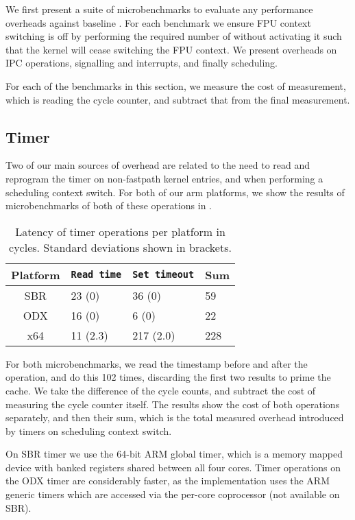 We first present a suite of microbenchmarks to evaluate any performance overheads against baseline
\selfour.
For each benchmark we ensure \gls{FPU} context switching is off by performing the required number of
without activating it such that the kernel will cease switching the FPU context. We present
overheads on IPC operations, signalling and interrupts, and finally scheduling. 

For each of the benchmarks in this section, we measure the cost of measurement, which is reading the
cycle counter, and subtract that from the final measurement.

\subsection{Timer}

Two of our main sources of overhead are related to the need to read and reprogram the timer on
non-fastpath kernel entries, and when performing a scheduling context switch. For both of our arm
platforms, we show the results of microbenchmarks of both of these operations in .

\begin{table}[ht]\centering
\begin{tabular}{|c|l|l|l|}\hline
    \textbf{Platform} & \texttt{Read time} & \texttt{Set timeout} & \textbf{Sum} \\\hline
    SBR              &     23 (0) & 36 (0)  & 59 \\\hline
    ODX              &     16 (0) & 6 (0) & 22 \\\hline
    x64              &     11 (2.3)   & 217 (2.0) & 228    \\\hline 
\end{tabular}
\caption{Latency of timer operations per platform in cycles. Standard deviations shown
in brackets.}
\label{t:timer}
\end{table}

For both microbenchmarks, we read the timestamp before and after the operation, and do this 102
times, discarding the first two results to prime the cache.  We take the difference of the cycle
counts, and subtract the cost of measuring the cycle counter itself. The results show the cost of
both operations separately, and then their sum, which is the total measured overhead introduced by timers on
scheduling context switch.

On SBR timer we use the 64-bit ARM global timer, which is a memory mapped device with banked registers shared
between all four cores. Timer operations on the ODX timer are considerably faster, as the
implementation uses the ARM generic timers which are accessed via the per-core coprocessor (not
available on SBR). 

